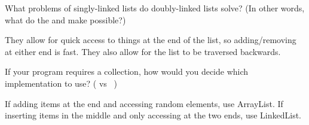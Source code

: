 \documentclass[12pt]{article}
\begin{document}
\Q \label{whydoubly}
What problems of singly-linked lists do doubly-linked lists solve? (In other words, what do the  and  make possible?)

\begin{answer}
They allow for quick access to things at the end of the list, so adding/removing at either end is fast.
They also allow for the list to be traversed backwards.
\end{answer}


%


\Q If your program requires a  collection, how would you decide which implementation to use? ( vs ~)

\begin{answer}
If adding items at the end and accessing random elements, use ArrayList.
If inserting items in the middle and only accessing at the two ends, use LinkedList.
\end{answer}
\end{document}
